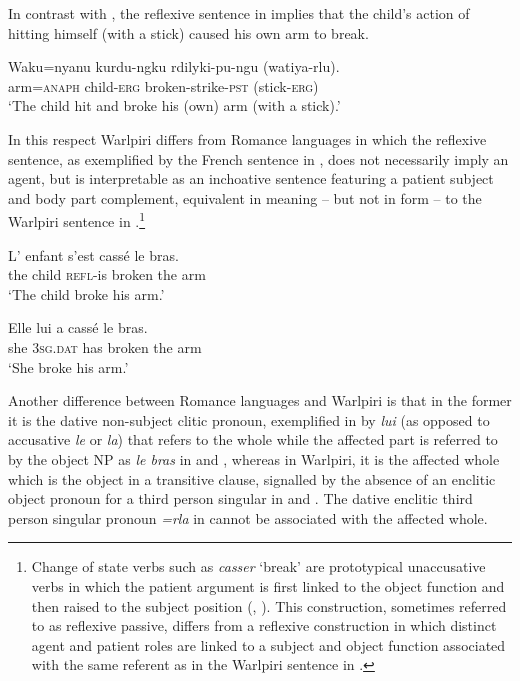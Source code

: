 \documentclass[output=paper]{../langscibook}
\begin{document}
In contrast with , the reflexive sentence in  implies that the child's action of hitting himself (with a stick) caused his own arm to break.

\ea%
    \label{ex:laughren:21}
\gll Waku=nyanu  kurdu-ngku  rdilyki-pu-ngu ({watiya-rlu}).\\
  arm=\textsc{anaph}  child-\textsc{erg}  broken-strike-\textsc{pst}  (stick-\textsc{erg)}\\
\glt `The child hit and broke his (own) arm (with a stick).'
\z


In this respect Warlpiri differs from Romance languages in which the reflexive sentence, as exemplified by the French sentence in , does not necessarily imply an agent, but is interpretable as an inchoative sentence featuring a patient subject and body part complement, equivalent in meaning – but not in form – to the Warlpiri sentence in .\footnote{\textsuperscript{} Change of state verbs such as \textit{casser} `break' are prototypical unaccusative verbs \citep{Perlmutter1973} in which the patient argument is first linked to the object function and then raised to the subject position (\citealt{Burzio1986}, \citealt{LevinHovav1995}). This construction, sometimes referred to as reflexive passive, differs from a reflexive construction in which distinct agent and patient roles are linked to a subject and object function associated with the same referent as in the Warlpiri sentence in .}

\ea%
    \label{ex:laughren:22}

\ea
\label{ex:laughren:22a}
\gll L' enfant  s'est  cassé  le  bras.\\
    the child  \textsc{refl}{}-is  broken  the  arm\\
\glt `The child broke his arm.'

\ex
\label{ex:laughren:22b}
\gll  Elle  lui  a  cassé  le  bras.\\
    she  3\textsc{sg}.\textsc{dat}  has  broken  the  arm\\
\glt `She broke his arm.'
\z
\z

Another difference between Romance languages and Warlpiri is that in the former it is the dative non-subject clitic pronoun, exemplified in  by \textit{lui} (as opposed to accusative \textit{le} or \textit{la}) that refers to the whole while the affected part is referred to by the object NP as \textit{le bras} in  and , whereas in Warlpiri, it is the affected whole which is the object in a transitive clause, signalled by the absence of an enclitic object pronoun for a third person singular in  and . The dative enclitic third person singular pronoun \textit{=rla} in  cannot be associated with the affected whole.
\end{document}
